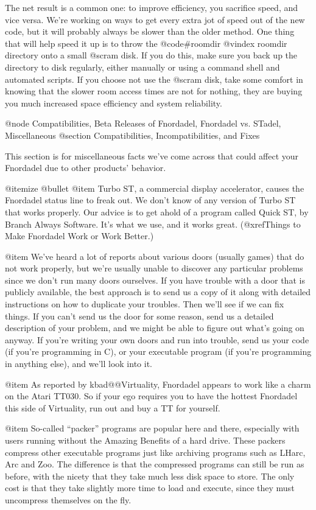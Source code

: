 {{{The net result is a common one: to improve efficiency, you sacrifice
speed, and vice versa.  We're working on ways to get every extra jot of speed
out of the new code, but it will probably always be slower than the older
method.  One thing that will help speed it up is to throw the @code{#roomdir}
@vindex roomdir
directory onto a small @sc{ram} disk.  If you do this, make sure you back up
the directory to disk regularly, either manually or using a command shell and
automated scripts.  If you choose not use the @sc{ram} disk, take some comfort
in knowing that the slower room access times are not for nothing, they are
buying you much increased space efficiency and system reliability.

@node Compatibilities, Beta Releases of Fnordadel, Fnordadel vs. STadel, Miscellaneous
@section Compatibilities, Incompatibilities, and Fixes

This section is for miscellaneous facts we've come across that could
affect your Fnordadel due to other products' behavior.

@itemize @bullet
@item
Turbo ST, a commercial display accelerator, causes the Fnordadel
status line to freak out.  We don't know of any version of Turbo
ST that works properly.  Our advice is to get ahold of a program
called Quick ST, by Branch Always Software.  It's what we use, and
it works great.  (@xref{Things to Make Fnordadel Work or Work Better}.)

@item
We've heard a lot of reports about various doors (usually games)
that do not work properly, but we're usually unable to discover
any particular problems since we don't run many doors ourselves.
If you have trouble with a door that is publicly available, the
best approach is to send us a copy of it along with detailed
instructions on how to duplicate your troubles.  Then we'll see
if we can fix things.  If you can't send us the door for some
reason, send us a detailed description of your problem, and we
might be able to figure out what's going on anyway.  If you're
writing your own doors and run into trouble, send us your code
(if you're programming in C), or your executable program (if
you're programming in anything else), and we'll look into it.

@item
As reported by kbad@@Virtuality, Fnordadel appears to work like
a charm on the Atari TT030.  So if your ego requires you to have
the hottest Fnordadel this side of Virtuality, run out and buy a
TT for yourself.

@item
So-called ``packer'' programs are popular here and there, especially
with users running without the Amazing Benefits of a hard drive.
These packers compress other executable programs just like archiving
programs such as LHarc, Arc and Zoo.  The difference is that the
compressed programs can still be run as before, with the nicety that
they take much less disk space to store.  The only cost is that they
take slightly more time to load and execute, since they must
uncompress themselves on the fly.

}}}
